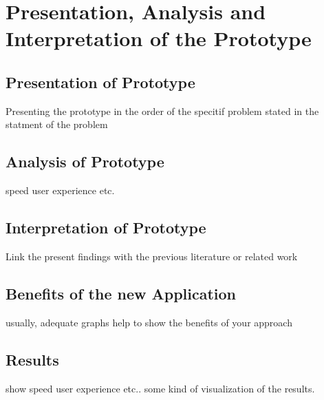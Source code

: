 \chapter{Presentation, Analysis
and Interpretation of
the Prototype}

\section{Presentation of Prototype}
Presenting the prototype in the order of the specitif problem stated in the statment of the problem


\section{Analysis of Prototype}
speed user experience etc.

\section{Interpretation of Prototype}
Link the present findings with the previous literature or related work

\section{Benefits of the new Application}
usually, adequate graphs help to show the benefits of your approach

\section{Results}
show speed user experience etc.. some kind of visualization of the results.